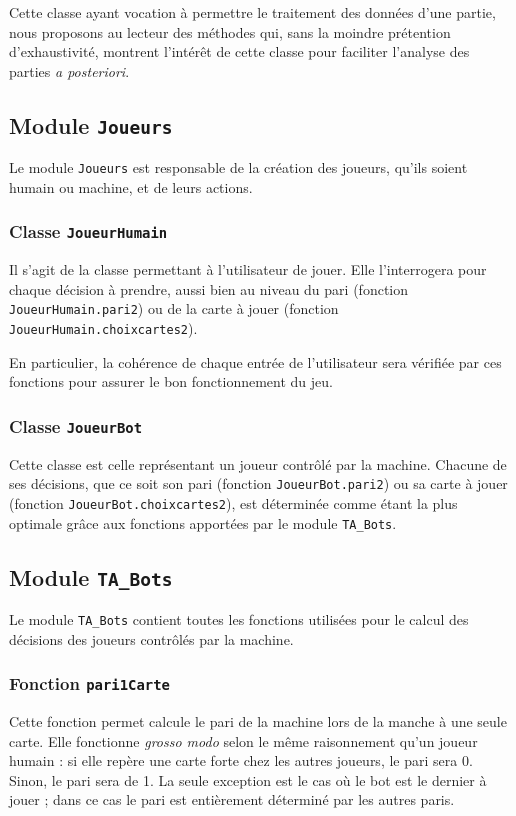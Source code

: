          Cette classe ayant vocation à permettre le traitement des données d'une partie, nous proposons au lecteur des méthodes qui, sans la moindre prétention d'exhaustivité, montrent l'intérêt de cette classe pour faciliter l'analyse des parties \textit{a posteriori}.

   \subsection{Module \texttt{Joueurs}}\label{subsec:module-joueurs}
      Le module \texttt{Joueurs} est responsable de la création des joueurs, qu'ils soient humain ou machine, et de leurs actions.

      \subsubsection{Classe \texttt{JoueurHumain}}
         Il s'agit de la classe permettant à l'utilisateur de jouer.
         Elle l'interrogera pour chaque décision à prendre, aussi bien au niveau du pari (fonction \texttt{JoueurHumain.pari2}) ou de la carte à jouer (fonction \texttt{JoueurHumain.choixcartes2}).

         En particulier, la cohérence de chaque entrée de l'utilisateur sera vérifiée par ces fonctions pour assurer le bon fonctionnement du jeu.

      \subsubsection{Classe \texttt{JoueurBot}}
         Cette classe est celle représentant un joueur contrôlé par la machine.
         Chacune de ses décisions, que ce soit son pari (fonction \texttt{JoueurBot.pari2}) ou sa carte à jouer (fonction \texttt{JoueurBot.choixcartes2}), est déterminée comme étant la plus optimale grâce aux fonctions apportées par le module \texttt{TA\_Bots}.
   
   \subsection{Module \texttt{TA\_Bots}}\label{subsec:module-ta-bots}
      Le module \texttt{TA\_Bots} contient toutes les fonctions utilisées pour le calcul des décisions des joueurs contrôlés par la machine.
      \subsubsection{Fonction \texttt{pari1Carte}}
         Cette fonction permet calcule le pari de la machine lors de la manche à une seule carte.
         Elle fonctionne \textit{grosso modo} selon le même raisonnement qu'un joueur humain : si elle repère une carte forte chez les autres joueurs, le pari sera 0.
         Sinon, le pari sera de 1.
         La seule exception est le cas où le bot est le dernier à jouer ;
         dans ce cas le pari est entièrement déterminé par les autres paris.

